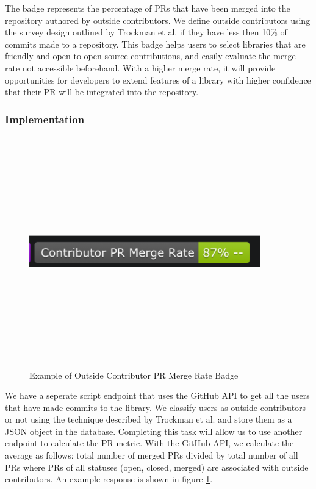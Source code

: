 \documentclass[12pt, letterpaper]{article}
\begin{document}
The badge represents the percentage of PRs that have been merged into the repository authored by outside contributors.
We define outside contributors using the survey design outlined by Trockman et al. \cite{githubbadges} if they have 
less then 10\% of commits made to a repository. 
This badge helps users to select libraries that are friendly and open to open source contributions,
and easily evaluate the merge rate not accessible beforehand.
With a higher merge rate, it will provide opportunities for developers to extend features of a library with 
higher confidence that their PR will be integrated into the repository.

\subsubsection{Implementation}

\begin{figure}[!htb]
    \centerline{
        \includegraphics[width=10cm,height=10cm,keepaspectratio=true]{prbadge}
    }
    \caption{
        Example of Outside Contributor PR Merge Rate Badge 
    }
    \label{prbadge}
\end{figure}

We have a seperate script endpoint that uses the GitHub \cite{github} API to get all the users
that have made commits to the library. We classify users as outside contributors or not using
the technique described by Trockman et al. \cite{githubbadges} and store them as a JSON object in the database.
Completing this task will allow us to use another endpoint to calculate the PR metric.
With the GitHub \cite{github} API, we calculate
the average as follows: total number of merged PRs divided by total number of all PRs where 
PRs of all statuses (open, closed, merged) are associated with outside contributors. 
An example response is shown in figure \ref{prbadge}.
\end{document}
